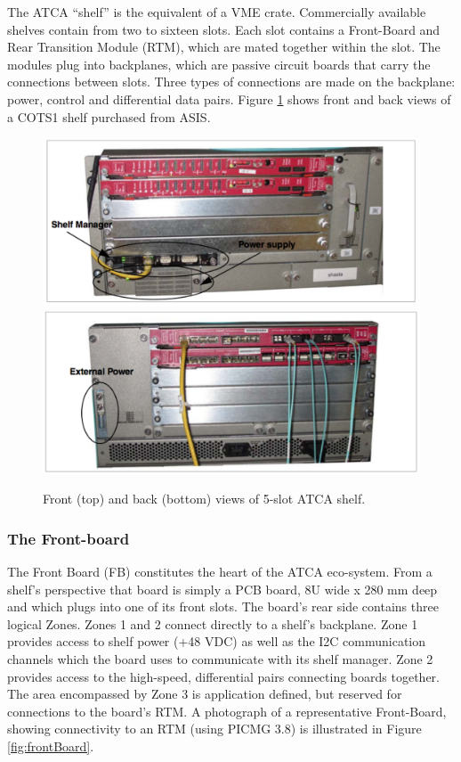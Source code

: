 The ATCA ``shelf'' is the equivalent of a VME crate. 
Commercially available shelves contain from two to sixteen slots. 
Each slot contains a Front-Board and Rear Transition Module (RTM),
which are mated together within the slot.
The modules plug into backplanes, which are passive circuit boards that
carry the connections between slots. 
Three types of connections are made on the backplane: 
power, control and differential data pairs. 
Figure \ref{fig:frontShelf} shows front and back views of a
 COTS1 shelf purchased from ASIS. 

\begin{figure}[tbh]
\includegraphics[scale=0.6]{shelf-front.pdf}
\includegraphics[scale=0.6]{shelf-back.pdf}
\caption{Front (top) and back (bottom) views of 5-slot ATCA shelf.}
\label{fig:frontShelf}
\end{figure} 

\subsubsection{The Front-board}
\label{sec:frontboard}
The Front Board (FB) constitutes the heart of the ATCA eco-system. 
From a shelf's perspective that board is simply a PCB board, 
8U wide x 280 mm deep and which plugs into one of its front slots. 
The board's rear side contains three logical Zones.
Zones 1 and 2 connect directly to a shelf's backplane. 
Zone 1 provides access to shelf power (+48 VDC) as well as the
I2C communication channels which the board uses to communicate with its shelf manager. 
Zone 2 provides access to the high-speed, differential pairs connecting boards together. 
The area encompassed by Zone 3 is application defined, but reserved for connections 
to the board's RTM.
A photograph of a representative Front-Board, 
showing connectivity to an RTM (using PICMG 3.8) 
is illustrated in Figure \ref{fig:frontBoard}.

